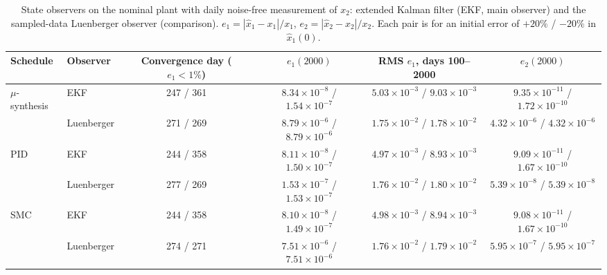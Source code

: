 \begin{table}[htbp]
\centering
\caption{State observers on the nominal plant with daily noise-free measurement of $x_2$: extended Kalman filter (EKF, main observer) and the sampled-data Luenberger observer (comparison). $e_1=|\hat{x}_1-x_1|/x_1$, $e_2=|\hat{x}_2-x_2|/x_2$. Each pair is for an initial error of $+20\%$ / $-20\%$ in $\hat{x}_1(0)$.}
\label{tab:observer_main}
\small
\begin{tabular}{llcccc}
\toprule
Schedule & Observer & Convergence day ($e_1<1\%$) & $e_1(2000)$ & RMS $e_1$, days 100--2000 & $e_2(2000)$ \\
\midrule
$\mu$-synthesis & EKF & 247 / 361 & $8.34{\times}10^{-8}$ / $1.54{\times}10^{-7}$ & $5.03{\times}10^{-3}$ / $9.03{\times}10^{-3}$ & $9.35{\times}10^{-11}$ / $1.72{\times}10^{-10}$ \\
 & Luenberger & 271 / 269 & $8.79{\times}10^{-6}$ / $8.79{\times}10^{-6}$ & $1.75{\times}10^{-2}$ / $1.78{\times}10^{-2}$ & $4.32{\times}10^{-6}$ / $4.32{\times}10^{-6}$ \\
\addlinespace
PID & EKF & 244 / 358 & $8.11{\times}10^{-8}$ / $1.50{\times}10^{-7}$ & $4.97{\times}10^{-3}$ / $8.93{\times}10^{-3}$ & $9.09{\times}10^{-11}$ / $1.67{\times}10^{-10}$ \\
 & Luenberger & 277 / 269 & $1.53{\times}10^{-7}$ / $1.53{\times}10^{-7}$ & $1.76{\times}10^{-2}$ / $1.80{\times}10^{-2}$ & $5.39{\times}10^{-8}$ / $5.39{\times}10^{-8}$ \\
\addlinespace
SMC & EKF & 244 / 358 & $8.10{\times}10^{-8}$ / $1.49{\times}10^{-7}$ & $4.98{\times}10^{-3}$ / $8.94{\times}10^{-3}$ & $9.08{\times}10^{-11}$ / $1.67{\times}10^{-10}$ \\
 & Luenberger & 274 / 271 & $7.51{\times}10^{-6}$ / $7.51{\times}10^{-6}$ & $1.76{\times}10^{-2}$ / $1.79{\times}10^{-2}$ & $5.95{\times}10^{-7}$ / $5.95{\times}10^{-7}$ \\
\bottomrule
\end{tabular}
\end{table}
